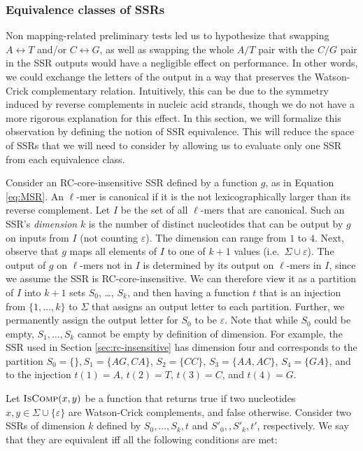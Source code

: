 \documentclass[
  11pt,
  twoside,
  BCOR=10mm,
  listof=totoc]{scrbook}
\begin{document}
\hypertarget{sec:equiv}{%
\subsubsection{Equivalence classes of SSRs}\label{sec:equiv}}

Non mapping-related preliminary tests led us to hypothesize that swapping \(A\leftrightarrow T\) and/or \(C\leftrightarrow G\), as well as swapping the whole \(A/T\) pair with the \(C/G\) pair in the SSR outputs would have a negligible effect on performance. In other words, we could exchange the letters of the output in a way that preserves the Watson-Crick complementary relation. Intuitively, this can be due to the symmetry induced by reverse complements in nucleic acid strands, though we do not have a more rigorous explanation for this effect. In this section, we will formalize this observation by defining the notion of SSR equivalence. This will reduce the space of SSRs that we will need to consider by allowing us to evaluate only one SSR from each equivalence class.

Consider an RC-core-insensitive SSR defined by a function \(g\), as in Equation \eqref{eq:MSR}. An \(\ell\)-mer is canonical if it is the not lexicographically larger than its reverse complement. Let \(I\) be the set of all \(\ell\)-mers that are canonical. Such an SSR's \emph{dimension} \(k\) is the number of distinct nucleotides that can be output by \(g\) on inputs from \(I\) (not counting \(\varepsilon\)). The dimension can range from \(1\) to \(4\). Next, observe that \(g\) maps all elements of \(I\) to one of \(k+ 1\) values (i.e.~\(\Sigma \cup \varepsilon\)). The output of \(g\) on \(\ell\)-mers not in \(I\) is determined by its output on \(\ell\)-mers in \(I\), since we assume the SSR is RC-core-insensitive. We can therefore view it as a partition of \(I\) into \(k+1\) sets \(S_0\), \ldots, \(S_k\), and then having a function \(t\) that is an injection from \(\{1, \ldots, k\}\) to \(\Sigma\) that assigns an output letter to each partition. Further, we permanently assign the output letter for \(S_0\) to be \(\varepsilon\). Note that while \(S_0\) could be empty, \(S_1, \ldots, S_k\) cannot be empty by definition of dimension. For example, the SSR used in Section \ref{sec:rc-insensitive} has dimension four and corresponds to the partition \(S_0 = \{\}, S_1=\{AG,CA\}\), \(S_2=\{CC\}\), \(S_3=\{AA,AC\}\), \(S_4=\{GA\}\), and to the injection \(t(1) = A\), \(t(2) =T\), \(t(3) = C\), and \(t(4) = G\).

Let \(\textsc{IsComp}(x,y)\) be a function that returns true if two nucleotides \(x, y \in \Sigma \cup \{\varepsilon\}\) are Watson-Crick complements, and false otherwise. Consider two SSRs of dimension \(k\) defined by \(S_0, \ldots, S_k, t\) and \(S'_0, , S'_k, t'\), respectively. We say that they are equivalent iff all the following conditions are met:
\end{document}
